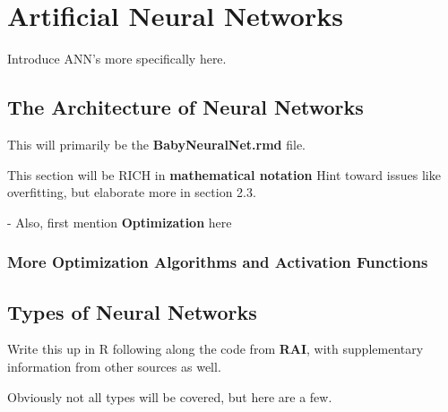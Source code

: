 \chapter{Artificial Neural Networks}
Introduce ANN's more specifically here.

\section{The Architecture of Neural Networks} %
This will primarily be the \textbf{BabyNeuralNet.rmd} file.

This section will be RICH in \textbf{mathematical notation}
Hint toward issues like overfitting, but elaborate more in section 2.3.

- Also, first mention \textbf{Optimization} here






\subsection{More Optimization Algorithms and Activation Functions}

\section{Types of Neural Networks} %

Write this up in R following along the code from \textbf{RAI}, with supplementary information from other sources as well.  

Obviously not all types will be covered, but here are a few.  

